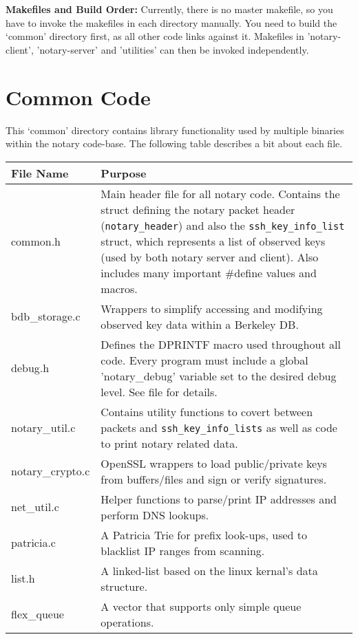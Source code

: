 \documentclass[pdftex,singlecolumn,11pt,letterpaper]{article}
\begin{document}
\noindent\textbf{Makefiles and Build Order:}  Currently, there is no master
makefile, so you have to invoke the makefiles in each directory manually. 
You need to build the `common' directory first, as all other code
links against it.  Makefiles in 'notary-client', 'notary-server' and 'utilities'
can then be invoked independently.  

\section {Common Code}

This `common' directory contains library functionality used by multiple 
binaries within the notary code-base.  The following table describes 
a bit about each file.  \\ 

\begin{tabular*}{1.1\textwidth}{ @{\extracolsep{\fill}} | p{3cm} | p{10cm} | }
\hline 
\textbf{File Name}  & \textbf{Purpose} \\
\hline 
common.h & Main header file for all notary code.  Contains the struct 
defining the notary packet header (\texttt{notary\_header}) and also the 
\texttt{ssh\_key\_info\_list} struct, which represents a list of observed
keys (used by both notary server and client).  Also includes many 
important \#define values and macros. \\

bdb\_storage.c & Wrappers to simplify accessing and modifying observed key
data within a Berkeley DB. \\  

debug.h & Defines the DPRINTF macro used throughout all code.  Every program
must include a global 'notary\_debug' variable set to the desired debug level.
See file for details.  \\

notary\_util.c & Contains utility functions to covert between packets and 
\texttt{ssh\_key\_info\_lists} as well as code to print notary related data. \\

notary\_crypto.c & OpenSSL wrappers to load public/private
keys from buffers/files and sign or verify signatures.  \\

net\_util.c & Helper functions to parse/print IP addresses and perform DNS 
lookups.  \\

patricia.c & A Patricia Trie for prefix look-ups, used to blacklist IP ranges
from scanning.  \\

list.h & A linked-list based on the linux kernal's data structure.  \\

flex\_queue & A vector that supports only simple queue operations. \\ 
\hline
\end{tabular*}\\
\end{document}
